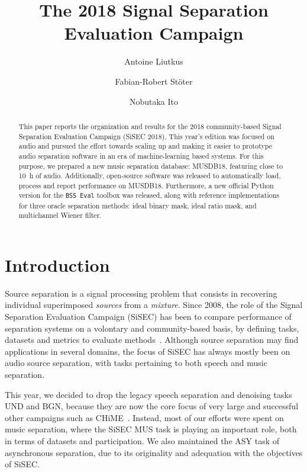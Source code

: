 \documentclass{llncs}
\begin{document}
\title{The 2018 Signal Separation Evaluation Campaign}
\author{
Antoine Liutkus \and
Fabian-Robert St\"{o}ter \and
Nobutaka Ito
}


\maketitle
%
\vspace{-3mm}
\begin{abstract}
This paper reports the organization and results for the 2018 community-based Signal Separation Evaluation Campaign (SiSEC 2018). This year's edition was focused on audio and pursued the effort towards scaling up and making it easier to prototype audio separation software in an era of machine-learning based systems. For this purpose, we prepared a new music separation database: MUSDB18, featuring close to 10~h of audio. Additionally, open-source software was released to automatically load, process and report performance on MUSDB18. Furthermore, a new official Python version for the \texttt{BSS~Eval} toolbox was released, along with reference implementations for three oracle separation methods: ideal binary mask, ideal ratio mask, and multichannel Wiener filter.
\end{abstract}

\setcounter{footnote}{0}
\section{Introduction}
\vspace{-2mm}
Source separation is a signal processing problem that consists in recovering individual superimposed \textit{sources} from a \textit{mixture}.  Since 2008, the role of the Signal Separation Evaluation Campaign (SiSEC) has been to compare performance of separation systems on a volontary and community-based basis, by defining tasks, datasets and metrics to evaluate methods~\cite{sassec2007,sisec2008,sisec0710,sisec2011,sisec2013,sisec2015,sisec2016}. Although source separation may find applications in several domains, the focus of SiSEC has always mostly been on audio source separation, with tasks pertaining to both speech and music separation.

This year, we decided to drop the legacy speech separation and denoising tasks UND and BGN, because they are now the core focus of very large and successful other campaigns such as CHiME~\cite{chime,chime2,chime3}. Instead, most of our efforts were spent on music separation, where the SiSEC MUS task is playing an important role, both in terms of datasets and participation. We also maintained the ASY task of asynchronous separation, due to its originality and adequation with the objectives of SiSEC.
\end{document}
